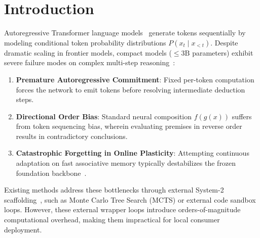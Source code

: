 \documentclass[11pt,a4paper]{article}
\begin{document}
\section{Introduction}
Autoregressive Transformer language models~\cite{vaswani2017attention} generate tokens sequentially by modeling conditional token probability distributions $P(x_t \mid x_{<t})$. Despite dramatic scaling in frontier models, compact models ($\le 3\text{B}$ parameters) exhibit severe failure modes on complex multi-step reasoning~\cite{chollet2019measure,snell2024scaling}:
\begin{enumerate}
    \item \textbf{Premature Autoregressive Commitment}: Fixed per-token computation forces the network to emit tokens before resolving intermediate deduction steps.
    \item \textbf{Directional Order Bias}: Standard neural composition $f(g(x))$ suffers from token sequencing bias, wherein evaluating premises in reverse order results in contradictory conclusions.
    \item \textbf{Catastrophic Forgetting in Online Plasticity}: Attempting continuous adaptation on fast associative memory typically destabilizes the frozen foundation backbone~\cite{kirkpatrick2017overcoming,ba2016using}.
\end{enumerate}

Existing methods address these bottlenecks through external System-2 scaffolding~\cite{bengio2017consciousness,greenblatt2024arc}, such as Monte Carlo Tree Search (MCTS) or external code sandbox loops. However, these external wrapper loops introduce orders-of-magnitude computational overhead, making them impractical for local consumer deployment.
\end{document}
